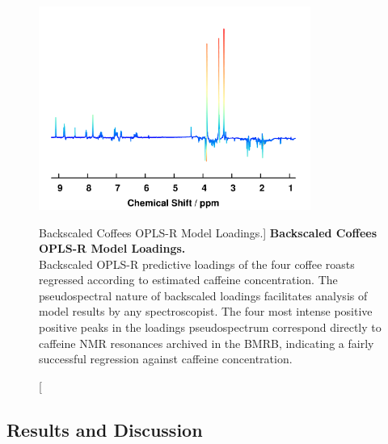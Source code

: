 \begin{figure}
\includegraphics[width=3.5in]{figs/apps/04-oplsr-p.png}
\caption
      [Backscaled Coffees OPLS-R Model Loadings.]{
  {\bf Backscaled Coffees OPLS-R Model Loadings.}
  \\
  Backscaled OPLS-R predictive loadings of the four coffee roasts regressed
  according to estimated caffeine concentration. The pseudospectral nature of
  backscaled loadings facilitates analysis of model results by any
  spectroscopist. The four most intense positive positive peaks in the
  loadings pseudospectrum correspond directly to caffeine NMR resonances
  archived in the BMRB, indicating a fairly successful regression against
  caffeine concentration.
}
\label{figure.4.4}
\end{figure}

\subsection{Results and Discussion}


